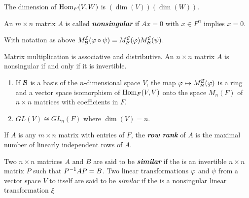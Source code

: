 \nl

\begin{cor}
The dimension of $\text{Hom}_F(V,W)$ is $(\dim(V))(\dim(W))$.
\end{cor}

\nl

\begin{defn}
An $m\times n$ matrix $A$ is called \textit{\textbf{nonsingular}} if $Ax = 0$ with $x\in F^n$ implies $x = 0$.
\end{defn}

\nl

\begin{thm}
With notation as above $M_{\mathcal{B}}^{\mathcal{E}}(\varphi\circ \psi) = M_{\mathcal{B}}^{\mathcal{E}}(\varphi) M_{\mathcal{B}}^{\mathcal{E}}(\psi)$.
\end{thm}

\nl

\begin{cor}
Matrix multiplication is associative and distributive. An $n\times n$ matrix $A$ is nonsingular if and only if it is invertible.
\end{cor}

\nl

\begin{cor}\nl
\begin{enumerate}
\item If $\mathcal{B}$ is a basis of the $n$-dimensional space $V$, the map $\varphi\mapsto M_{\mathcal{B}}^{\mathcal{B}}(\varphi)$ is a ring and a vector space isomorphism of $\text{Hom}_F(V,V)$ onto the space $M_n(F)$ of $n\times n$ matrices with coefficients in $F$.
\item $GL(V)\cong GL_n(F)$ where $\dim(V) = n$. 
\end{enumerate}
\end{cor}

\nl

\begin{defn}
If $A$ is any $m\times n$ matrix with entries of $F$, the \textit{\textbf{row rank}} of $A$ is the maximal number of linearly independent rows of $A$.
\end{defn}

\nl

\begin{defn}
Two $n\times n$ matrices $A$ and $B$ are said to be \textit{\textbf{similar}} if the is an invertible $n\times n$ matrix $P$ such that $P^{-1} A P = B$. Two linear transformations $\varphi$ and $\psi$ from a vector space $V$ to itself are said to be \textit{similar} if the is a nonsingular linear transformation $\xi$
\end{defn}

